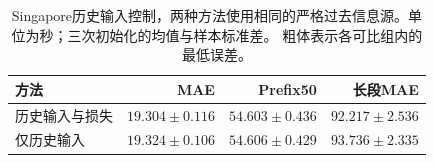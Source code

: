 \begin{table}[t]
\centering\footnotesize\setlength{\tabcolsep}{3pt}
\caption{Singapore历史输入控制，两种方法使用相同的严格过去信息源。单位为秒；三次初始化的均值与样本标准差。 粗体表示各可比组内的最低误差。}\label{tab:history}
\begin{tabular}{lrrr}\toprule
方法 & MAE & Prefix50 & 长段MAE\\\midrule
历史输入与损失 & $\mathbf{19.304\pm0.116}$ & $\mathbf{54.603\pm0.436}$ & $\mathbf{92.217\pm2.536}$\\
仅历史输入 & $19.324\pm0.106$ & $54.606\pm0.429$ & $93.736\pm2.335$\\
\bottomrule\end{tabular}
\end{table}
